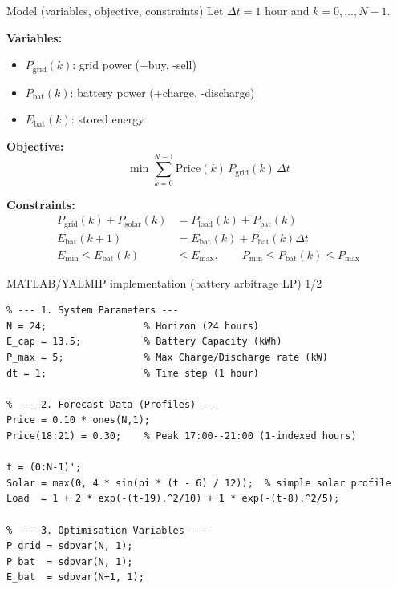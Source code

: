 \documentclass[aspectratio=169,10pt]{beamer}
\begin{document}
\begin{frame}{Model (variables, objective, constraints)}
Let $\Delta t=1$ hour and $k=0,\dots,N-1$.

\textbf{Variables:}
\begin{itemize}
  \item $P_{\mathrm{grid}}(k)$: grid power (+buy, -sell)
  \item $P_{\mathrm{bat}}(k)$: battery power (+charge, -discharge)
  \item $E_{\mathrm{bat}}(k)$: stored energy
\end{itemize}

\textbf{Objective:}
\begin{equation*}
\min \sum_{k=0}^{N-1} \mathrm{Price}(k)\,P_{\mathrm{grid}}(k)\,\Delta t
\end{equation*}

\textbf{Constraints:}
\begin{align*}
P_{\mathrm{grid}}(k)+P_{\mathrm{solar}}(k)&=P_{\mathrm{load}}(k)+P_{\mathrm{bat}}(k)\\
E_{\mathrm{bat}}(k+1)&=E_{\mathrm{bat}}(k)+P_{\mathrm{bat}}(k)\Delta t\\
E_{\min}\le E_{\mathrm{bat}}(k)&\le E_{\max},\qquad
P_{\min}\le P_{\mathrm{bat}}(k)\le P_{\max}
\end{align*}
\end{frame}

\begin{frame}[fragile]{MATLAB/YALMIP implementation (battery arbitrage LP) 1/2}
\scriptsize
\begin{lstlisting}
% --- 1. System Parameters ---
N = 24;                 % Horizon (24 hours)
E_cap = 13.5;           % Battery Capacity (kWh)
P_max = 5;              % Max Charge/Discharge rate (kW)
dt = 1;                 % Time step (1 hour)

% --- 2. Forecast Data (Profiles) ---
Price = 0.10 * ones(N,1);
Price(18:21) = 0.30;    % Peak 17:00--21:00 (1-indexed hours)

t = (0:N-1)';
Solar = max(0, 4 * sin(pi * (t - 6) / 12));  % simple solar profile
Load  = 1 + 2 * exp(-(t-19).^2/10) + 1 * exp(-(t-8).^2/5);

% --- 3. Optimisation Variables ---
P_grid = sdpvar(N, 1);
P_bat  = sdpvar(N, 1);
E_bat  = sdpvar(N+1, 1);
\end{lstlisting}
\end{frame}
\end{document}
